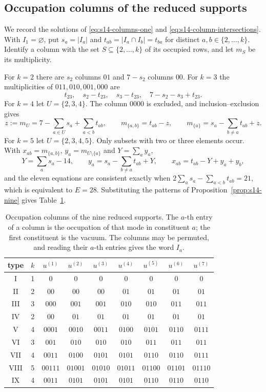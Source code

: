 \documentclass{article}
\theoremstyle{definition}
\theoremstyle{remark}
\begin{document}
\subsection{Occupation columns of the reduced supports}
\label{app:occupation-data}

We record the solutions of \eqref{eq:s14-columns-one} and
\eqref{eq:s14-column-intersections}. With $I_1=\varnothing$, put
$s_a=\lvert I_a\rvert$ and $t_{ab}=\lvert I_a\cap I_b\rvert=t_{ba}$ for
distinct $a,b\in\{2,\ldots,k\}$. Identify a column with the set
$S\subseteq\{2,\ldots,k\}$ of its occupied rows, and let $m_S$ be its
multiplicity.

For $k=2$ there are $s_2$ columns $01$ and $7-s_2$ columns $00$. For $k=3$
the multiplicities of $011,010,001,000$ are
\[
 t_{23},\quad s_2-t_{23},\quad s_3-t_{23},\quad 7-s_2-s_3+t_{23}.
\]
For $k=4$ let $U=\{2,3,4\}$. The column $0000$ is excluded, and
inclusion--exclusion gives
\[
 z:=m_U=7-\sum_{a\in U}s_a+\sum_{a<b}t_{ab},\qquad
 m_{\{a,b\}}=t_{ab}-z,\qquad
 m_{\{a\}}=s_a-\sum_{b\ne a}t_{ab}+z .
\]
For $k=5$ let $U=\{2,3,4,5\}$. Only subsets with two or three elements
occur. With $x_{ab}=m_{\{a,b\}}$, $y_a=m_{U\setminus\{a\}}$ and
$Y=\sum_ay_a$,
\[
 Y=\sum_as_a-14,\qquad
 y_a=s_a-\sum_{b\ne a}t_{ab}+Y,\qquad
 x_{ab}=t_{ab}-Y+y_a+y_b ,
\]
and the eleven equations are consistent exactly when
$2\sum_as_a-\sum_{a<b}t_{ab}=21$, which is equivalent to $E=28$.
Substituting the patterns of Proposition~\ref{prop:s14-nine} gives
Table~\ref{tab:s14-columns}.

\begin{table}[ht]
\centering
\renewcommand{\arraystretch}{1.15}
\small
\begin{tabular}{cc*{7}{c}}
\toprule
type & $k$ & $u^{(1)}$ & $u^{(2)}$ & $u^{(3)}$ & $u^{(4)}$
     & $u^{(5)}$ & $u^{(6)}$ & $u^{(7)}$\\
\midrule
I    & 1 & $0$ & $0$ & $0$ & $0$ & $0$ & $0$ & $0$\\
II   & 2 & $00$ & $00$ & $00$ & $01$ & $01$ & $01$ & $01$\\
III  & 3 & $000$ & $001$ & $001$ & $010$ & $010$ & $011$ & $011$\\
IV   & 2 & $00$ & $01$ & $01$ & $01$ & $01$ & $01$ & $01$\\
V    & 4 & $0001$ & $0010$ & $0011$ & $0100$ & $0101$ & $0110$ & $0111$\\
VI   & 3 & $001$ & $010$ & $010$ & $010$ & $011$ & $011$ & $011$\\
VII  & 4 & $0011$ & $0100$ & $0101$ & $0101$ & $0110$ & $0110$ & $0111$\\
VIII & 5 & $00111$ & $01001$ & $01010$ & $01011$ & $01100$ & $01101$ & $01110$\\
IX   & 4 & $0011$ & $0101$ & $0101$ & $0101$ & $0110$ & $0110$ & $0110$\\
\bottomrule
\end{tabular}
\caption{Occupation columns of the nine reduced supports. The $a$-th entry of
a column is the occupation of that mode in constituent $a$; the first
constituent is the vacuum. The columns may be permuted, and reading their
$a$-th entries gives the word $I_a$.}
\label{tab:s14-columns}
\end{table}
\end{document}
